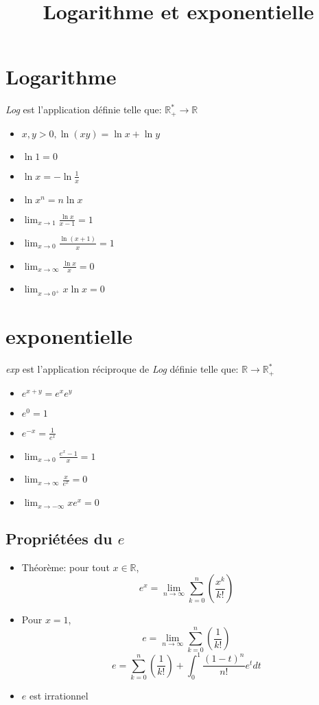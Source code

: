 \documentclass[fleqn]{article}
\title{Logarithme et exponentielle}
\date{}
\begin{document}
\maketitle

\section{Logarithme}
\emph{Log} est l'application d\'efinie telle que: \(\mathbb{R}^*_+ \rightarrow \mathbb{R}\)
\begin{itemize}
	\item $ x,y>0, \ln (xy) = \ln x + \ln y $
	\item $ \ln 1 = 0 $
	\item $ \ln x = -\ln \frac{1}{x} $
	\item $ \ln x^n = n\ln x $
	\newline
	\item $ \lim_{x\to 1} \frac{\ln x}{x-1} = 1 $
	\item $ \lim_{x\to 0} \frac{\ln (x+1)}{x} = 1 $
	\item $ \lim_{x\to\infty} \frac{\ln x}{x} = 0 $
	\item $ \lim_{x\to 0^+} x\ln x = 0 $
\end{itemize}

\section{exponentielle}
\emph{exp} est l'application r\'eciproque de \emph{Log} d\'efinie telle que: \(\mathbb{R} \rightarrow \mathbb{R}^*_+\)
\begin{itemize}
	\item $ e^{x+y} = e^xe^y $
	\item $ e^0 = 1 $
	\item $ e^{-x} = \frac{1}{e^x} $
	\newline
	\item $ \lim_{x\to 0} \frac{e^x-1}{x} = 1 $
	\item $ \lim_{x\to\infty} \frac{x}{e^x} = 0 $
	\item $ \lim_{x\to-\infty} xe^x = 0 $
\end{itemize}

\subsection{Propri\'et\'ees du $e$}
\begin{itemize}
	\item Th\'{e}or\`{e}me: pour tout $x \in \mathbb{R}$,
		\[ e^x = \lim_{n\to\infty} \sum_{k=0}^{n} (\frac{x^k}{k!}) \]
	\item Pour $x = 1$,
		\[ e = \lim_{n\to\infty} \sum_{k=0}^{n} (\frac{1}{k!}) \]
		\[ e = \sum_{k=0}^{n} (\frac{1}{k!}) + \int_{0}^{1} \frac{(1-t)^n}{n!}e^tdt \]
	\item $e$ est irrationnel
\end{itemize}
\end{document}
